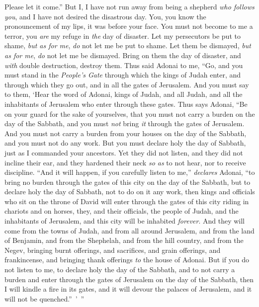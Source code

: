 \begin{biblechapter}
Please let it come.”
\verse But I, I have not run away from being a shepherd \textit{who follows you}, 
and I have not desired the disastrous day. 
You, you know the pronouncement of my lips, 
it was before your face.
\verse You must not become to me a terror, 
you \textit{are} my refuge in \textit{the} day of disaster.
\verse Let my persecutors be put to shame, 
\textit{but as for me}, \textit{do} not let me be put to shame. 
Let them be dismayed, 
\textit{but as for me}, \textit{do} not let me be dismayed. 
Bring on them the day of disaster, 
and \textit{with} double destruction, destroy them.
 Thus said Adonai to me, “Go, and you must stand in the \textit{People’s Gate} through which the kings of Judah enter, and through which they go out, and in all the gates of Jerusalem.
\verse And you must say to them, ‘Hear the word of Adonai, kings of Judah, and all Judah, and all the inhabitants of Jerusalem who enter through these gates.
\verse Thus says Adonai, “Be on your guard for the sake of yourselves, that you must not carry a burden on the day of the Sabbath, and you must \textit{not} bring \textit{it} through the gates of Jerusalem.
\verse And you must not carry a burden from your houses on the day of the Sabbath, and you must not do any work. But you must declare holy the day of Sabbath, just as I commanded your ancestors.
\verse Yet they did not listen, and they did not incline their ear, and they hardened their neck \textit{so as} to not hear, nor to receive discipline.
\verse “And it will happen, if you carefully listen to me,” \textit{declares} Adonai, “to bring no burden through the gates of this city on the day of the Sabbath, but to declare holy the day of Sabbath, not to do on it any work,
\verse then kings and officials who sit on the throne of David will enter through the gates of this city riding in chariots and on horses, they, and their officials, the people of Judah, and the inhabitants of Jerusalem, and this city will be inhabited \textit{forever}.
\verse And they will come from the towns of Judah, and from all around Jerusalem, and from the land of Benjamin, and from the Shephelah, and from the hill country, and from the Negev, bringing burnt offerings, and sacrifices, and grain offerings, and frankincense, and bringing thank offerings \textit{to} the house of Adonai.
\verse But if you do not listen to me, to declare holy the day of the Sabbath, and to not carry a burden and enter through the gates of Jerusalem on the day of the Sabbath, then I will kindle a fire in its gates, and it will devour the palaces of Jerusalem, and it will not be quenched.” ’ ”
\end{biblechapter}


